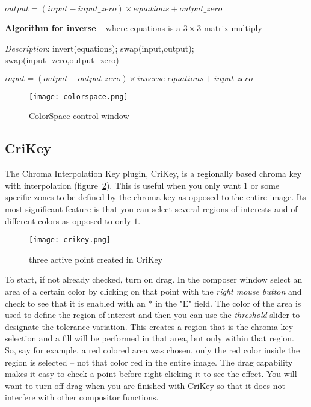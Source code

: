 \qquad $output = (input - input\_zero) \times equations + output\_zero$

\textbf{Algorithm for inverse}  -- where equations is a $3\times3$ matrix multiply

\textit{Description}:    invert(equations); swap(input,output); swap(input\_zero,output\_zero)

\qquad $input = (output - output\_zero) \times inverse\_equations + input\_zero$

\begin{figure}[hbtp]
    \centering
    \texttt{[image: colorspace.png]}
    \caption{ColorSpace control window}
    \label{fig:colorspace}
\end{figure}


\subsection{CriKey}%
\label{sub:crikey}

The Chroma Interpolation Key plugin, CriKey, is a regionally based chroma key with interpolation (figure~\ref{fig:crikey}). This is useful when you only want 1 or some specific zones to be defined by the chroma key as opposed to the entire image. Its most significant feature is that you can select several regions of interests and of different colors as opposed to only $1$.

\begin{figure}[htpb]
    \centering
    \texttt{[image: crikey.png]}
    \caption{three active point created in CriKey}
    \label{fig:crikey}
\end{figure}

To start, if not already checked, turn on drag. In the composer window select an area of a certain color by clicking on that point with the \textit{right mouse button} and check to see that it is enabled with an $*$ in the "E" field. The color of the area is used to define the region of interest and then you can use the \textit{threshold} slider to designate the tolerance variation. This creates a region that is the chroma key selection and a fill will be performed in that area, but only within that region. So, say for example, a red colored area was chosen, only the red color inside the region is selected -- not that color red in the entire image. The drag capability makes it easy to check a point before right clicking it to see the effect. You will want to turn off drag when you are finished with CriKey so that it does not interfere with other compositor functions.

